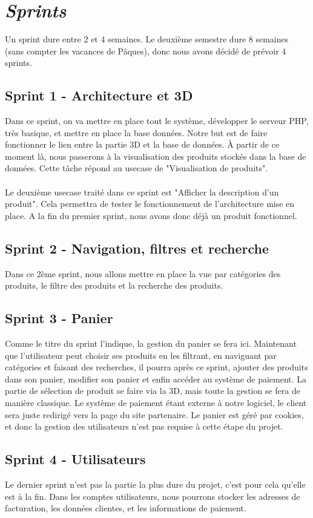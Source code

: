 \documentclass[12pt]{article}
\begin{document}
\newpage
\section{\textit{Sprints}}
Un sprint dure entre 2 et 4 semaines. Le deuxième semestre dure 8 semaines (sans compter les vacances de Pâques), donc nous avons décidé de prévoir 4 sprints.

\subsection{Sprint 1 - Architecture et 3D}
Dans ce sprint, on va mettre en place tout le système, développer le serveur PHP, très basique, et mettre en place la base données.
Notre but est de faire fonctionner le lien entre la partie 3D et la base de données.
À partir de ce moment là, nous passerons à la visualisation des produits stockés dans la base de données. Cette tâche répond au usecase de "Visualisation de produits".\\\\
Le deuxième usecase traité dans ce sprint est "Afficher la description d'un produit". Cela permettra de tester le fonctionnement de l'architecture mise en place.
A la fin du premier sprint, nous avons donc déjà un produit fonctionnel.

\subsection{Sprint 2 - Navigation, filtres et recherche}
Dans ce 2ème sprint, nous allons mettre en place la vue par catégories des produits, le filtre des produits et la recherche des produits.

\subsection{Sprint 3 - Panier}
Comme le titre du sprint l'indique, la gestion du panier se fera ici. Maintenant que l'utilisateur peut choisir ses produits en les filtrant, en naviguant
par catégories et faisant des recherches, il pourra après ce sprint, ajouter des produits dans son panier, modifier son panier et enfin accéder au système de paiement.
La partie de sélection de produit se faire via la 3D, mais toute la gestion se fera de manière classique.
Le système de paiement étant externe à notre logiciel, le client sera juste redirigé vers la page du site partenaire.
Le panier est géré par cookies, et donc la gestion des utilisateurs n'est pas requise à cette étape du projet.

\subsection{Sprint 4 - Utilisateurs}
Le dernier sprint n'est pas la partie la plus dure du projet, c'est pour cela qu'elle est à la fin.
Dans les comptes utilisateurs, nous pourrons stocker les adresses de facturation, les données clientes, et les informations de paiement.
\end{document}

